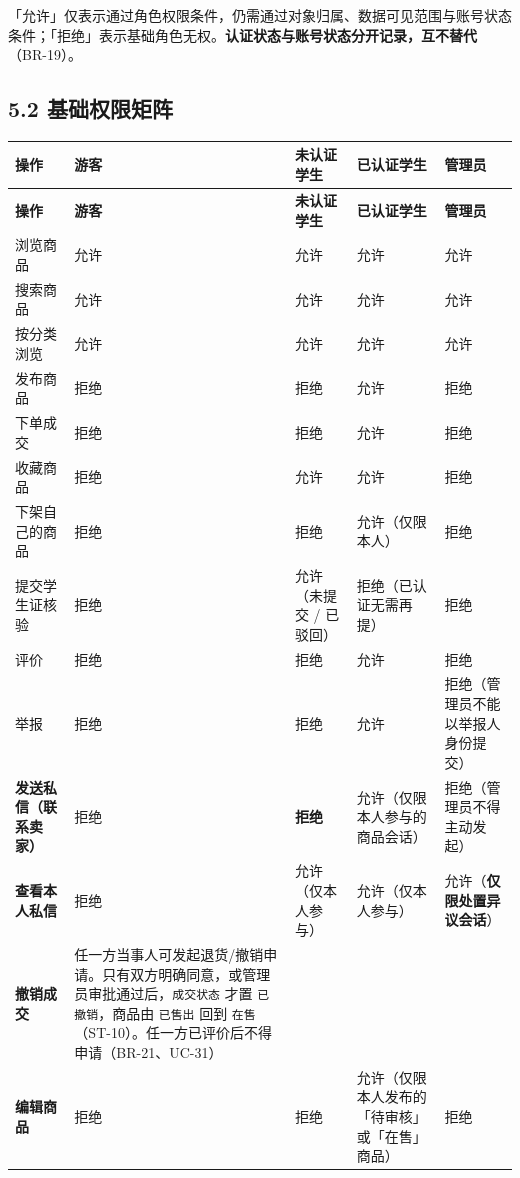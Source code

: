 \documentclass[12pt,a4paper]{ctexart}
\begin{document}
「允许」仅表示通过角色权限条件，仍需通过对象归属、数据可见范围与账号状态条件；「拒绝」表示基础角色无权。\textbf{认证状态与账号状态分开记录，互不替代}（BR-19）。


\subsection*{5.2 基础权限矩阵}

{\scriptsize
\begin{longtable}{|p{1.81cm}|p{7.24cm}|p{1.75cm}|p{2.88cm}|p{2.32cm}|}
\hline
\textbf{操作} & \textbf{游客} & \textbf{未认证学生} & \textbf{已认证学生} & \textbf{管理员} \\
\hline
\endfirsthead
\hline
\textbf{操作} & \textbf{游客} & \textbf{未认证学生} & \textbf{已认证学生} & \textbf{管理员} \\
\hline
\endhead
\hline
\endfoot
浏览商品 & 允许 & 允许 & 允许 & 允许 \\
\hline
搜索商品 & 允许 & 允许 & 允许 & 允许 \\
\hline
按分类浏览 & 允许 & 允许 & 允许 & 允许 \\
\hline
发布商品 & 拒绝 & 拒绝 & 允许 & 拒绝 \\
\hline
下单成交 & 拒绝 & 拒绝 & 允许 & 拒绝 \\
\hline
收藏商品 & 拒绝 & 允许 & 允许 & 拒绝 \\
\hline
下架自己的商品 & 拒绝 & 拒绝 & 允许（仅限本人） & 拒绝 \\
\hline
提交学生证核验 & 拒绝 & 允许（未提交 / 已驳回） & 拒绝（已认证无需再提） & 拒绝 \\
\hline
评价 & 拒绝 & 拒绝 & 允许 & 拒绝 \\
\hline
举报 & 拒绝 & 拒绝 & 允许 & 拒绝（管理员不能以举报人身份提交） \\
\hline
\textbf{发送私信（联系卖家）} & 拒绝 & \textbf{拒绝} & 允许（仅限本人参与的商品会话） & 拒绝（管理员不得主动发起） \\
\hline
\textbf{查看本人私信} & 拒绝 & 允许（仅本人参与） & 允许（仅本人参与） & 允许（\textbf{仅限处置异议会话}） \\
\hline
\textbf{撤销成交} & 任一方当事人可发起退货/撤销申请。只有双方明确同意，或管理员审批通过后，\texttt{成交状态} 才置 \texttt{已撤销}，商品由 \texttt{已售出} 回到 \texttt{在售}（ST-10）。任一方已评价后不得申请（BR-21、UC-31） &  &  &  \\
\hline
\textbf{编辑商品} & 拒绝 & 拒绝 & 允许（仅限本人发布的「待审核」或「在售」商品） & 拒绝 \\

\end{longtable}}
\end{document}
